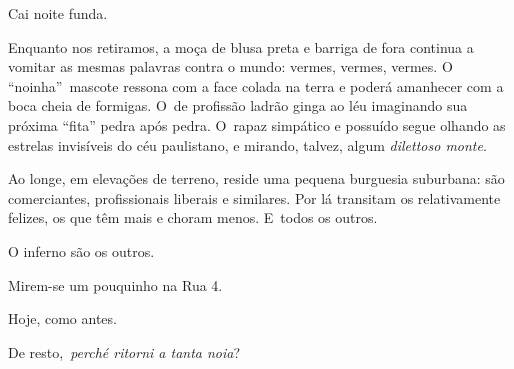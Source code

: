  

Cai noite funda.

Enquanto nos retiramos, a moça de blusa preta e barriga de fora continua
a vomitar as mesmas palavras contra o mundo: vermes, vermes, vermes. O
``noinha''~mascote ressona com a face colada na terra e poderá amanhecer
com a boca cheia de formigas. O~de profissão ladrão ginga ao léu
imaginando sua próxima ``fita'' pedra após pedra. O~rapaz simpático e
possuído segue olhando as estrelas invisíveis do céu paulistano, e
mirando, talvez, algum \emph{dilettoso monte}.

Ao longe, em elevações de terreno, reside uma pequena burguesia
suburbana: são comerciantes, profissionais liberais e similares. Por lá
transitam os relativamente felizes, os que têm mais e choram menos. E~todos os outros.

O inferno são os outros.

 

Mirem-se um pouquinho na Rua 4.

Hoje, como antes.

De resto,~\emph{perché ritorni a tanta noia}?
